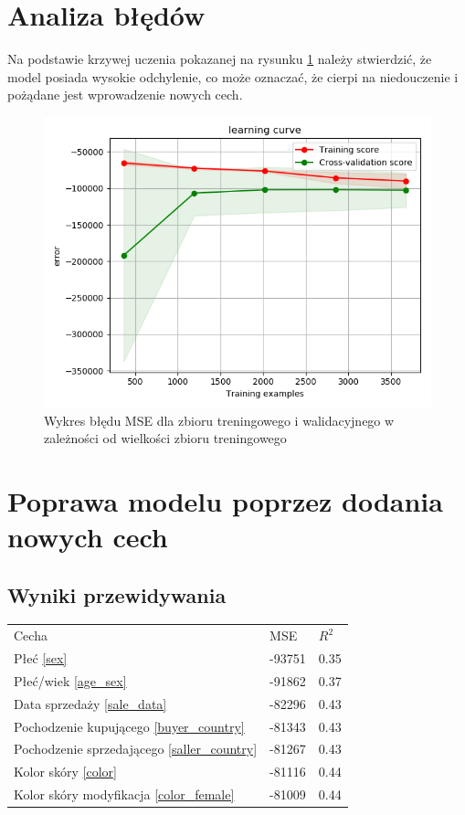 \documentclass[a4paper,12pt]{article}
\begin{document}
\section{Analiza błędów}
	Na podstawie krzywej uczenia pokazanej na rysunku \ref{learning_curve} należy stwierdzić, że model posiada wysokie odchylenie, co może oznaczać, że cierpi na niedouczenie i pożądane jest wprowadzenie nowych cech.
	
		\begin{figure}[h]
					\centering
					\includegraphics[scale=0.6]{obrazy/learning_curve.png} 
					\caption{Wykres błędu MSE dla zbioru treningowego i walidacyjnego w zależności od wielkości zbioru treningowego}
					\label{learning_curve}
		\end{figure}	
		
\section{Poprawa modelu poprzez dodania nowych cech}		
	\subsection{Wyniki przewidywania}
		\begin{tabular}{lll}
			Cecha			&	MSE		&	$R^2$\\
			Płeć \ref{sex}	&	-93751	&	0.35\\
			Płeć/wiek \ref{age_sex}	&	-91862	&	0.37\\
			Data sprzedaży	\ref{sale_data}	&	-82296	&	0.43\\
			Pochodzenie kupującego \ref{buyer_country}	&	-81343	&	0.43\\
			Pochodzenie sprzedającego	\ref{saller_country}	&	-81267	&	0.43\\
			Kolor skóry	\ref{color}	&	-81116	&	0.44\\
			Kolor skóry	modyfikacja \ref{color_female}	&	-81009	&	0.44\\
			
				
		\end{tabular}
\end{document}
